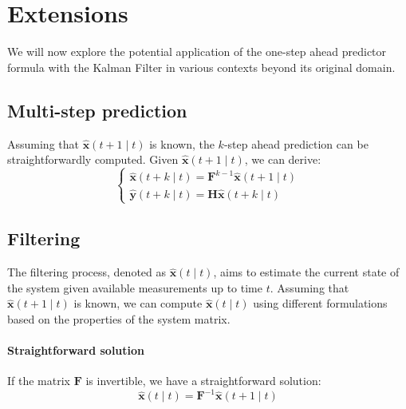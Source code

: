 \section{Extensions}

We will now explore the potential application of the one-step ahead predictor formula with the Kalman Filter in various contexts beyond its original domain.

\subsection{Multi-step prediction}
Assuming that $\hat{\mathbf{x}}(t+1\mid t)$ is known, the $k$-step ahead prediction can be straightforwardly computed. 
Given $\hat{\mathbf{x}}(t+1\mid t)$, we can derive:
\[\begin{cases}
    \hat{\mathbf{x}}(t+k\mid t)=\mathbf{F}^{k-1} \hat{\mathbf{x}}(t+1\mid t) \\
    \hat{\mathbf{y}}(t+k\mid t)=\mathbf{H} \hat{\mathbf{x}}(t+k\mid t)
\end{cases}\]

\subsection{Filtering}
The filtering process, denoted as $\hat{\mathbf{x}}(t\mid t)$, aims to estimate the current state of the system given available measurements up to time $t$. 
Assuming that $\hat{\mathbf{x}}(t+1\mid t)$ is known, we can compute $\hat{\mathbf{x}}(t\mid t)$ using different formulations based on the properties of the system matrix.

\paragraph*{Straightforward solution}
If the matrix $\mathbf{F}$ is invertible, we have a straightforward solution:
\[\hat{\mathbf{x}}(t\mid t)=\mathbf{F}^{-1} \hat{\mathbf{x}}(t+1\mid t)\]

